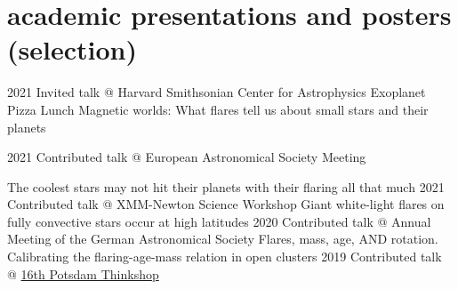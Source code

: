 \documentclass[9.5pt]{k-cv} %
\begin{document}
\section{academic presentations and posters (selection)}

\begin{entrylist}
\entry
{2021}
{Invited talk @ Harvard Smithsonian Center for Astrophysics Exoplanet Pizza Lunch}
{}%
{Magnetic worlds: What flares tell us about small stars and their planets}

\entry
{2021}
{Contributed talk @ European Astronomical Society Meeting}
{}%

{The coolest stars may not hit their planets with their flaring all that much}
\entry
{2021}
{Contributed talk @ XMM-Newton Science Workshop}
{}%
{Giant white-light flares on fully convective stars occur at high latitudes}
\entry
{2020}
{Contributed talk @ Annual Meeting of the German Astronomical Society}
{}%
{Flares, mass, age, AND rotation. Calibrating the flaring-age-mass relation in open clusters}
\entry
{2019}
{Contributed talk @ \href{https://thinkshop.aip.de/16/cms/} {16th Potsdam Thinkshop}}
{}%


\end{entrylist}
\end{document}
